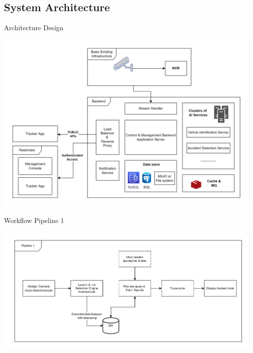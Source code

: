 \documentclass{beamer}
\begin{document}
	\subsection{System Architecture}
	\begin{frame}{Architecture Design}
		\begin{center}
			\includegraphics[width=\linewidth]{res/architecture_high_level}
		\end{center}
	\end{frame}

	\begin{frame}{Workflow Pipeline 1}
		\begin{center}
			\includegraphics[width=\linewidth]{res/pipeline1}
		\end{center}
	\end{frame}
\end{document}
